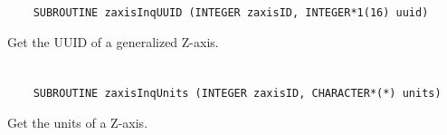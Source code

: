 \begin{verbatim}
    SUBROUTINE zaxisInqUUID (INTEGER zaxisID, INTEGER*1(16) uuid)
\end{verbatim}

Get the UUID of a generalized Z-axis.


\section*{\tt {}}

\begin{verbatim}
    SUBROUTINE zaxisInqUnits (INTEGER zaxisID, CHARACTER*(*) units)
\end{verbatim}

Get the units of a Z-axis.


